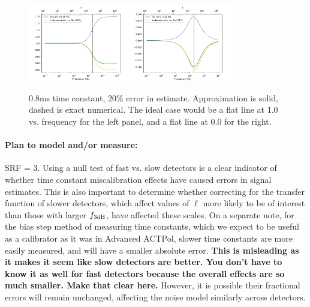 \begin{figure}[h!]
\centering
\includegraphics[width=0.4\textwidth]{figures/tau_ampl_error_800us_20pError.png}\quad\includegraphics[width=0.4\textwidth]{figures/tau_phase_error_800us_20pError.png}
\caption{0.8ms time constant, 20\% error in estimate. Approximation is solid, dashed is exact numerical. The ideal case would be a flat line at 1.0 vs. frequency for the left panel, and a flat line at 0.0 for the right.}
\label{tau_miscal}
\end{figure}

\paragraph{Plan to model and/or measure:}
SRF = 3. Using a null test of fast vs. slow detectors is a clear indicator of whether time constant miscalibration effects have caused errors in signal estimates. This is also important to determine whether correcting for the transfer function of slower detectors, which affect values of $\ell$ more likely to be of interest than those with larger $f_{\mbox{\scriptsize 3dB}}$, have affected these scales. On a separate note, for the bias step method of measuring time constants, which we expect to be useful as a calibrator as it was in Advanced ACTPol, slower time constants are more easily measured, and will have a smaller absolute error. \textbf{This is misleading as it makes it seem like slow detectors are better. You don't have to know it as well for fast detectors because the overall effects are so much smaller. Make that clear here.} However, it is possible their fractional errors will remain unchanged, affecting the noise model similarly across detectors.

